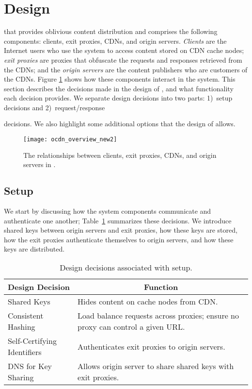 \section{Design}
\label{sec:design}

\system{} that provides oblivious content distribution and  
comprises the following components: clients, exit proxies, CDNs, and origin 
servers.  {\em Clients} are the Internet users who use the system to access content
stored on CDN cache nodes; {\em exit proxies} are proxies that obfuscate the requests
and responses retrieved from the CDNs; and the {\em origin servers} are the content
publishers who are customers of the CDNs.  Figure \ref{fig:ocd_overview} shows how
these components interact in the system.  This section describes the decisions 
made in the design of \system{}, and what functionality each decision provides.  
We separate design decisions into two parts: 1)~setup decisions and 2)~request/response

decisions.  We also highlight some additional options that the design of 
\system{} allows.

\begin{figure}[t!]
\centering
\texttt{[image: ocdn\_overview\_new2]}
\caption{The relationships between clients, exit proxies, CDNs, and origin servers in 
\system{}.}
\label{fig:ocd_overview}
\end{figure}

\subsection{\system{} Setup}
We start by discussing how the system components communicate and authenticate 
one another; Table~\ref{tab:setup} summarizes these decisions. 
We introduce shared keys between origin servers and exit proxies, how these keys
are 
stored, how the exit proxies authenticate themselves to origin servers, and how these 
keys are distributed.

\begin{table}[t!]
\footnotesize
\centering
\begin{tabular}{ p{1.15in}  p{1.8in} } 
 \multicolumn{1}{c}{\bf Design Decision} & \multicolumn{1}{c}{\bf Function} \\
\hline \hline
 Shared Keys & {Hides content on cache nodes from CDN.} \\
 Consistent Hashing & {Load balance requests across proxies; ensure no proxy can
 control a given URL.} \\
 Self-Certifying Identifiers & {Authenticates exit proxies to origin servers.} \\
 DNS for Key Sharing & {Allows origin server to share shared keys with exit
 proxies.} \\ \hline
\end{tabular}
\caption{Design decisions associated with \system{} setup.}
\label{tab:setup}
\end{table}

